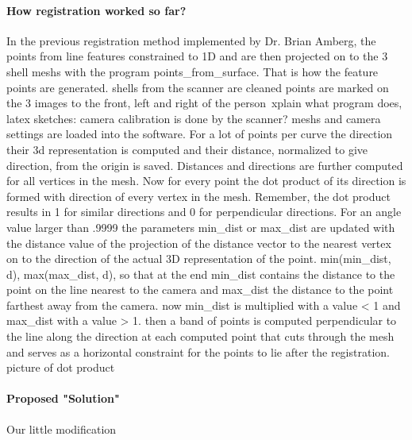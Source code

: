 \paragraph{How registration worked so far?}
In the previous registration method implemented by Dr. Brian Amberg, the
points from line features constrained to 1D
 and are then projected on to the 3 shell meshs with the program points_from_surface. That is how the feature points are generated.
shells from the scanner are cleaned
points are marked on the 3 images to the front, left and right of the person\
xplain what program does, latex sketches:
camera calibration is done by the scanner?
meshs and camera settings are loaded into the software. For a lot of points per curve the direction their 3d representation is computed and their distance, normalized to give direction,  from the origin is saved. Distances and directions are further computed for all vertices in the mesh. Now for every point the dot product of its direction is formed with direction of every vertex in the mesh. Remember, the dot product results in 1 for similar directions and 0 for perpendicular directions.
For an angle value larger than .9999 the parameters min_dist or max_dist are updated with the distance value of the projection of the distance vector to the nearest vertex on to the direction of the actual 3D representation of the point. min(min_dist, d), max(max_dist, d), so that at the end min_dist contains the distance to the point on the line nearest to the camera and max_dist the distance to the point farthest away from the camera. now min_dist is multiplied with a value < 1 and
max_dist with a value > 1. 
then a band of points is computed perpendicular to the line along the direction at each computed point that cuts through the mesh and serves as a horizontal constraint for the points to lie after the registration.
picture of dot product

\paragraph{Proposed "Solution"}
Our little modification

